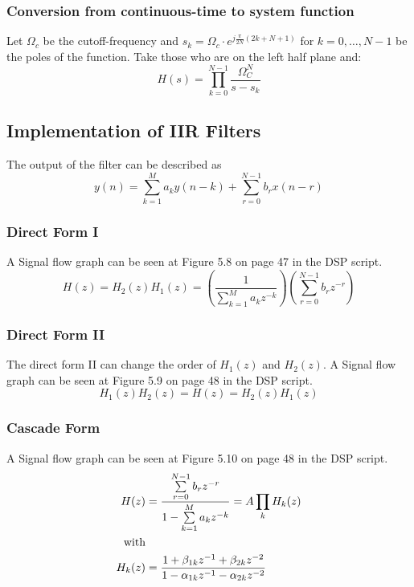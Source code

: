 \documentclass[accentcolor=tud4c,9.5pt,nochapname,bigchapter,paper=a5report]{tudreport}
\begin{document}
\subsubsection{Conversion from continuous-time to system function}
Let $\Omega_c$ be the cutoff-frequency and $s_k=\Omega_c \cdot e^{j\frac{\pi}{2N}(2k+N+1)}$ for $k=0,\ldots,N-1$ be the poles of the function. Take those who are on the left half plane and:
\begin{equation}
H(s)=\prod\limits_{k=0}^{N-1} \frac{\Omega_C^N}{s-s_k}
\end{equation}  
\subsection{Implementation of IIR Filters}
The output of the filter can be described as
\begin{equation}
y(n) = \sum\limits_{k=1}^{M}a_k y(n-k)+\sum\limits_{r=0}^{N-1}b_r x(n-r)
\end{equation}
\subsubsection{Direct Form I}
A Signal flow graph can be seen at Figure 5.8 on page 47 in the DSP script.
\begin{equation}
H(z)=H_2(z)H_1(z)=\left(\frac{1}{\sum\limits_{k=1}^{M}a_k z^{-k}}\right)\left(\sum\limits_{r=0}^{N-1}b_rz^{-r}\right)
\end{equation}
\subsubsection{Direct Form II}
The direct form II can change the order of $H_1(z)$ and $H_2(z)$. A Signal flow graph can be seen at Figure 5.9 on page 48 in the DSP script.
\begin{equation}
H_1(z)H_2(z)=H(z)=H_2(z)H_1(z)
\end{equation}
\subsubsection{Cascade Form}
A Signal flow graph can be seen at Figure 5.10 on page 48 in the DSP script.
\begin{subequations}
\begin{align}
H(z)&=\frac{\sum\limits_{r=0}^{N-1}b_rz^{-r}}{1-\sum\limits_{k=1}^{M}a_k z^{-k}}=A\prod\limits_k H_k(z)\\
\text{with} \notag\\
H_k(z)&=\frac{1+\beta_{1k}z^{-1}+\beta_{2k}z^{-2}}{1-\alpha_{1k}z^{-1}-\alpha_{2k}z^{-2}}
\end{align}
\end{subequations}
\end{document}
